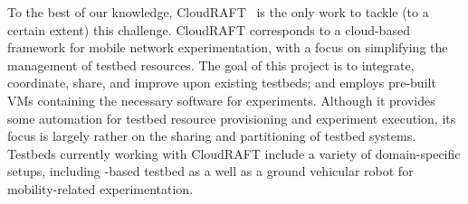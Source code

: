 To the best of our knowledge, CloudRAFT~\cite{cloudraft} is the only work to tackle (to a certain extent) this challenge.
CloudRAFT corresponds to a cloud-based framework for mobile network experimentation, with a focus on simplifying the management of testbed resources.
The goal of this project is to integrate, coordinate, share, and improve upon existing testbeds; and employs pre-built \glspl{VM} containing the necessary software for experiments.
Although it provides some automation for testbed resource provisioning and experiment execution, its focus is largely rather on the sharing and partitioning of testbed systems.
Testbeds currently working with CloudRAFT include a variety of domain-specific setups, including -based testbed as a well as a ground vehicular robot for mobility-related experimentation.
